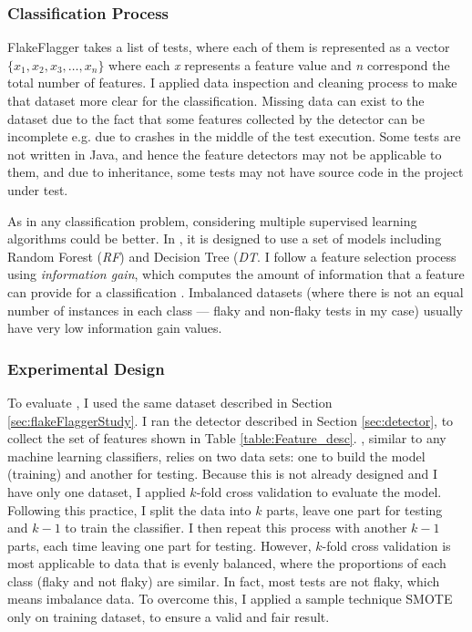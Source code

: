 

\subsubsection{Classification Process}

FlakeFlagger takes a list of tests, where each of them is represented as a vector $\{x_1, x_2, x_3,\dots, x_n\}$  where each \emph{x} represents a feature value and \emph{n} correspond the total number of features. I applied data inspection and cleaning process to make that dataset more clear for the classification. Missing data can exist to the dataset due to the fact that some features collected by the detector can be incomplete e.g. due to crashes in the middle of the test execution. Some tests are not written in Java, and hence the feature detectors may not be applicable to them, and due to inheritance, some tests may not have source code in the project under test.

As in any classification problem, considering multiple supervised learning algorithms could be better. In \sysName, it is designed to use a set of models including Random Forest (\emph{RF}) and Decision Tree (\emph{DT}. I follow a feature selection process using \emph{information gain}, which computes the amount of information that a feature can provide for a classification \cite{lei2012feature}. Imbalanced datasets (where there is not an equal number of instances in each class --- flaky and non-flaky tests in my case) usually have very low information gain values. 


\subsubsection{Experimental Design}
\label{sec:Prediction_Design}
To evaluate \sysName, I used the same dataset described in Section \ref{sec:flakeFlaggerStudy}. I ran the detector described in Section \ref{sec:detector}, to collect the set of features shown in Table \ref{table:Feature_desc}. \sysName, similar to any machine learning classifiers, relies on two data sets: one to build the model (training) and another for testing. Because this is not already designed and I have only one dataset, I applied $k$-fold cross validation \cite{kohavi1995study} to evaluate the model. Following this practice, I split the data into $k$ parts, leave one part for testing and $k-1$ to train the classifier.
I then repeat this process with another $k-1$ parts, each time leaving one part for testing.
However, $k$-fold cross validation is most applicable to data that is evenly balanced, where the proportions of each class (flaky and not flaky) are similar. In fact, most tests are not flaky, which means imbalance data. To overcome this, I applied a sample technique SMOTE \cite{SMOTE} only on training dataset, to ensure a valid and fair result.



